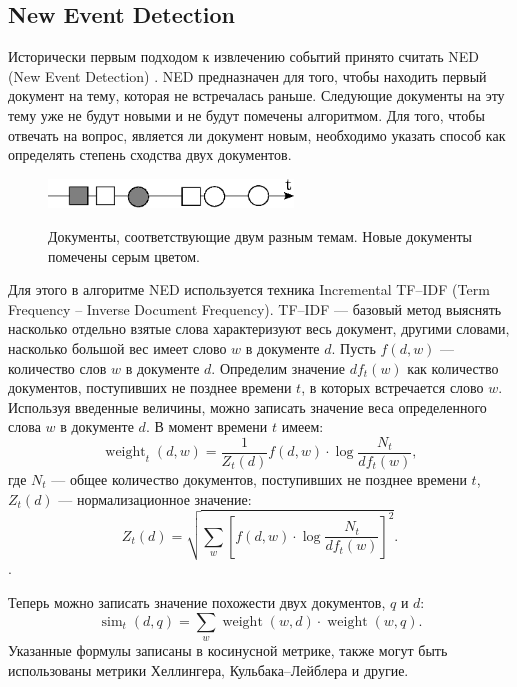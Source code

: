 \documentclass[12pt, a4paper]{article}
\newcommand\todo[1]{\marginpar{\textcolor{red}{#1}}}
\DeclareMathOperator{\weight}{weight}
\DeclareMathOperator{\simu}{sim}
\begin{document}
  
  \subsection{New Event Detection}
  \label{ned-subsection}
	Исторически первым подходом к извлечению событий принято считать NED (New Event Detection) \cite{ned}. NED предназначен для того, чтобы находить первый документ на тему, которая не встречалась раньше. Следующие документы на эту тему уже не будут новыми и не будут помечены алгоритмом. Для того, чтобы отвечать на вопрос, является ли документ новым, необходимо указать способ как определять степень сходства двух документов.
	
\begin{figure}[H]
  \centering
  \includegraphics[width=0.58\textwidth]{ned.eps}
  \\
  \caption{Документы, соответствующие двум разным темам. Новые документы помечены серым цветом.}
  \end{figure}  

	Для этого в алгоритме NED используется техника Incremental TF--IDF (Term Frequency -- Inverse Document Frequency). TF--IDF --- базовый метод выяснять насколько отдельно взятые слова характеризуют весь документ, другими словами, насколько большой вес имеет слово $w$ в документе $d$. Пусть $f(d,w)$ --- количество слов $w$ в документе $d$. Определим значение $df_t(w)$ как количество документов, поступивших не позднее времени $t$, в которых встречается слово $w$. Используя введенные величины, можно записать значение веса определенного слова $w$ в документе $d$. В момент времени $t$ имеем:
	\begin{equation}
	\weight_t(d,w) = \frac{1}{Z_t(d)}f(d,w) \cdot \log \frac{N_t}{df_t(w)},
	\end{equation}
	где $N_t$ --- общее количество документов, поступивших не позднее времени $t$, $Z_t(d)$ --- нормализационное значение:
	\begin{equation}
	Z_t(d) = \sqrt{\sum_w \left[ f(d,w) \cdot \log \frac{N_t}{df_t(w)} \right]^2}.
	\end{equation}.
	
	Теперь можно записать значение похожести двух документов, $q$ и $d$:
	\begin{equation}
	\simu_t(d,q) = \sum_w \weight(w, d) \cdot \weight(w, q).
	\end{equation}
	Указанные формулы записаны в косинусной метрике, также могут быть использованы метрики Хеллингера, Кульбака--Лейблера и другие.
	
\end{document}
